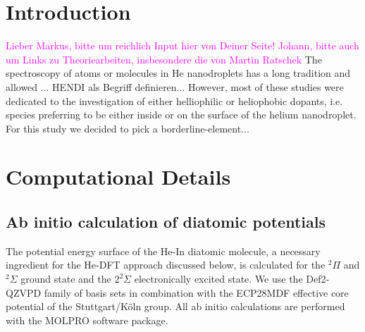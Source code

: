 \documentclass[twoside,twocolumn,9pt]{article}
\def\hl#1{\textcolor{magenta}{#1}}  %
\begin{document}
\renewcommand*\rmdefault{bch}\normalfont\upshape
\rmfamily
\section*{}
\vspace{-1cm}





\section{Introduction}
\hl{Lieber Markus, bitte um reichlich Input hier von Deiner Seite! Johann, bitte auch um Links zu Theoriearbeiten, insbesondere die von Martin Ratschek}
The spectroscopy of atoms or molecules in He nanodroplets has a long tradition and allowed ... 
HENDI als Begriff definieren...
However, most of these studies were dedicated to the investigation of either helliophilic or heliophobic dopants, i.e. species preferring to be either inside or on the surface of the helium nanodroplet. 
For this study we decided to pick a borderline-element...


\section{Computational Details}

\subsection{Ab initio calculation of diatomic potentials}
The potential energy surface of the He-In diatomic molecule, a necessary ingredient for the He-DFT approach discussed below, is calculated for the $^2\Pi{}$ and $^2\Sigma$ ground state and the $2^2\Sigma{}$ electronically excited state. We use the Def2-QZVPD family of basis sets \cite{Rappoport2010} in combination with the ECP28MDF effective core potential of the Stuttgart/K\"oln group.\cite{Metz2000}  All ab initio calculations are performed with the MOLPRO software package.\cite{MOLPRO}
\end{document}
